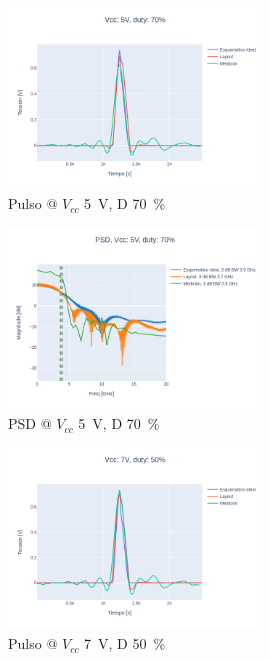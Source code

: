 \begin{figure}
  \centering
    \includegraphics[width=0.6\textwidth]{images/plots/Vcc_5V_duty_70_time_domain.png}
    \caption{Pulso @ $V_{cc}$ \qty{5}{\volt}, D \qty{70}{\percent} }
    \label{fig:plots_5v_70}
\end{figure}

\begin{figure}
  \centering
    \includegraphics[width=0.6\textwidth]{images/plots/Vcc_5V_duty_70_psd.png}
    \caption{PSD @ $V_{cc}$ \qty{5}{\volt}, D \qty{70}{\percent} }
    \label{fig:psd_5v_70}
\end{figure}

\begin{figure}
  \centering
    \includegraphics[width=0.6\textwidth]{images/plots/Vcc_7V_duty_50_time_domain.png}
    \caption{Pulso @ $V_{cc}$ \qty{7}{\volt}, D \qty{50}{\percent} }
    \label{fig:plots_7v_50}
\end{figure}

